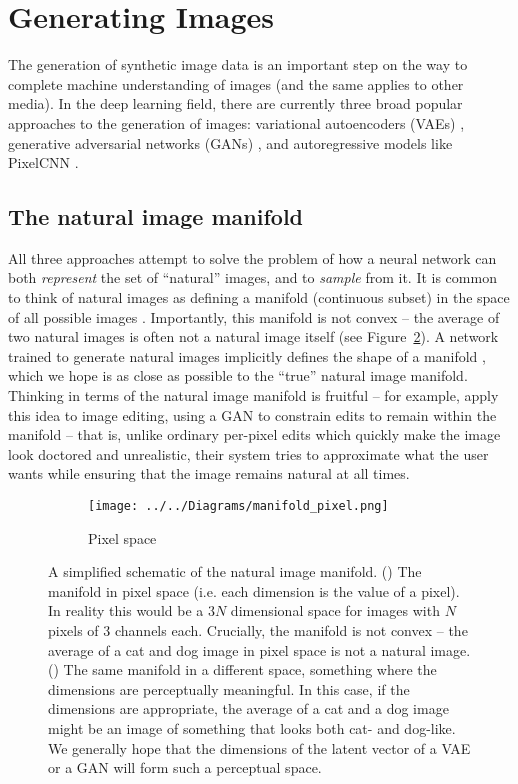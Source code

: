\documentclass[11pt, a4paper, openany]{book}
\newcommand{\nquote}[1]{``{#1}''}
\begin{document}
\section{Generating Images}

The generation of synthetic image data is an important step on the way to complete machine understanding of images (and the same applies to other media). In the deep learning field, there are currently three broad popular approaches to the generation of images: variational autoencoders (VAEs) \citep{vae}, generative adversarial networks (GANs) \citep{gan}, and autoregressive models like PixelCNN \citep{pixelcnn2}.

\subsection{The natural image manifold}

All three approaches attempt to solve the problem of how a neural network can both \emph{represent} the set of \nquote{natural} images, and to \emph{sample} from it. It is common to think of natural images as defining a manifold (continuous subset) in the space of all possible images \citep{manifoldmanipulation,imageinpainting,manifoldmixup}. Importantly, this manifold is not convex -- the average of two natural images is often not a natural image itself (see Figure~\ref{manifold}). A network trained to generate natural images implicitly defines the shape of a manifold \citep{manifoldmanipulation}, which we hope is as close as possible to the \nquote{true} natural image manifold. Thinking in terms of the natural image manifold is fruitful -- for example, \citet{manifoldmanipulation} apply this idea to image editing, using a GAN to constrain edits to remain within the manifold -- that is, unlike ordinary per-pixel edits which quickly make the image look doctored and unrealistic, their system tries to approximate what the user wants while ensuring that the image remains natural at all times.

\begin{figure}
	\centering	
    \begin{subfigure}{\columnwidth}
        \centering
        \caption{Pixel space}
        \texttt{[image: ../../Diagrams/manifold\_pixel.png]}
        \label{manifold:pixel}
    \end{subfigure}
    \caption[Simplified schematic of the natural image manifold]{A simplified schematic of the natural image manifold. () The manifold in pixel space (i.e. each dimension is the value of a pixel). In reality this would be a $3N$ dimensional space for images with $N$ pixels of 3 channels each. Crucially, the manifold is not convex -- the average of a cat and dog image in pixel space is not a natural image. () The same manifold in a different space, something where the dimensions are perceptually meaningful. In this case, if the dimensions are appropriate, the average of a cat and a dog image might be an image of something that looks both cat- and dog-like. We generally hope that the dimensions of the latent vector of a VAE or a GAN will form such a perceptual space.}
    \label{manifold}
\end{figure}
    
\end{document}
